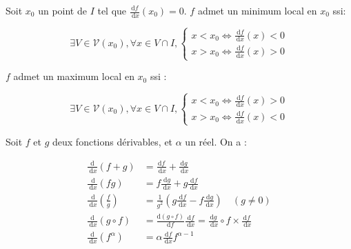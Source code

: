 Soit $x_0$ un point de $I$ tel que $\frac{\mathrm{d} f}{\mathrm{~d} x}\left(x_0\right)=0$. $f$ admet un minimum local en $x_0$ ssi:

$$
\exists V \in \mathcal{V}\left(x_0\right), \forall x \in V \cap I,\left\{\begin{array}{l}
x<x_0 \Longleftrightarrow \frac{\mathrm{~d} f}{\mathrm{~d} x}(x)<0 \\
x>x_0 \Longleftrightarrow \frac{\mathrm{~d} f}{\mathrm{~d} x}(x)>0
\end{array}\right.
$$

$f$ admet un maximum local en $x_0$ ssi :

$$
\exists V \in \mathcal{V}\left(x_0\right), \forall x \in V \cap I,\left\{\begin{array}{l}
x<x_0 \Longleftrightarrow \frac{\mathrm{~d} f}{\mathrm{~d} x}(x)>0 \\
x>x_0 \Longleftrightarrow \frac{\mathrm{~d} f}{\mathrm{~d} x}(x)<0
\end{array}\right.
$$

Soit $f$ et $g$ deux fonctions dérivables, et $\alpha$ un réel. On a :

$$
\begin{aligned}
\frac{\mathrm{d}}{\mathrm{~d} x}(f+g) & =\frac{\mathrm{d} f}{\mathrm{~d} x}+\frac{\mathrm{d} g}{\mathrm{~d} x} \\
\frac{\mathrm{~d}}{\mathrm{~d} x}(f g) & =f \frac{\mathrm{~d} g}{\mathrm{~d} x}+g \frac{\mathrm{~d} f}{\mathrm{~d} x} \\
\frac{\mathrm{~d}}{\mathrm{~d} x}\left(\frac{f}{g}\right) & =\frac{1}{g^2}\left(g \frac{\mathrm{~d} f}{\mathrm{~d} x}-f \frac{\mathrm{~d} g}{\mathrm{~d} x}\right) \quad(g \neq 0) \\
\frac{\mathrm{d}}{\mathrm{~d} x}(g \circ f) & =\frac{\mathrm{d}(g \circ f)}{\mathrm{d} f} \frac{\mathrm{~d} f}{\mathrm{~d} x}=\frac{\mathrm{d} g}{\mathrm{~d} x} \circ f \times \frac{\mathrm{d} f}{\mathrm{~d} x}\\
\frac{\mathrm{d}}{\mathrm{~d} x}(f^{\alpha}) & = \alpha \frac{\mathrm{~d} f}{\mathrm{~d} x} f^{\alpha-1} 
\end{aligned}
$$

